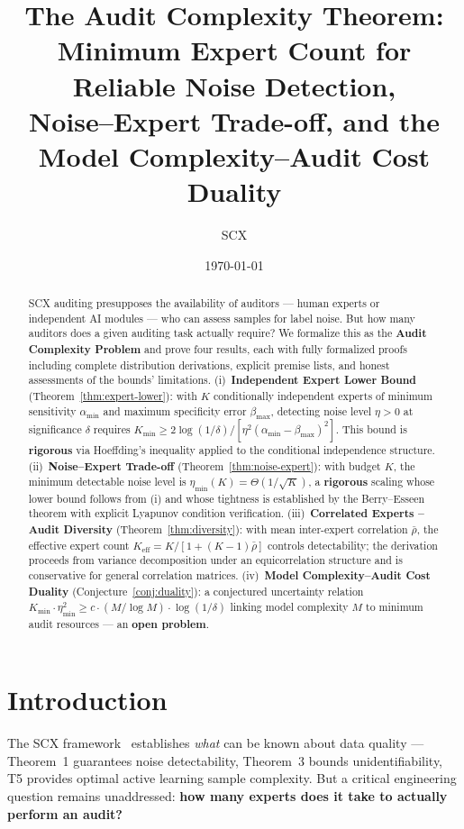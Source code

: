 \documentclass[12pt,a4paper]{article}
\title{\bfseries The Audit Complexity Theorem:\\
Minimum Expert Count for Reliable Noise Detection,\\
Noise--Expert Trade-off, and the\\
Model Complexity--Audit Cost Duality}
\author{SCX}
\date{\today}
\newcommand{\etamin}{\eta_{\min}}
\newcommand{\rhobar}{\bar{\rho}}
\begin{document}
\maketitle

\begin{abstract}
\textsf{SCX} auditing presupposes the availability of auditors --- human experts or
independent AI modules --- who can assess samples for label noise.  But how many
auditors does a given auditing task actually require?  We formalize this as the
\textbf{Audit Complexity Problem} and prove four results, each with fully
formalized proofs including complete distribution derivations, explicit premise
lists, and honest assessments of the bounds' limitations.
(i)~\textbf{Independent Expert Lower Bound} (Theorem~\ref{thm:expert-lower}):
with $K$ conditionally independent experts of minimum sensitivity
$\alpha_{\min}$ and maximum specificity error $\beta_{\max}$, detecting noise
level $\eta>0$ at significance $\delta$ requires
$K_{\min}\geq 2\log(1/\delta)/[\eta^{2}(\alpha_{\min}-\beta_{\max})^{2}]$.
This bound is \textbf{rigorous} via Hoeffding's inequality applied to the
conditional independence structure.
(ii)~\textbf{Noise--Expert Trade-off} (Theorem~\ref{thm:noise-expert}):
with budget $K$, the minimum detectable noise level is
$\etamin(K)=\Theta(1/\sqrt{K})$, a \textbf{rigorous} scaling whose lower bound
follows from (i) and whose tightness is established by the Berry--Esseen theorem
with explicit Lyapunov condition verification.
(iii)~\textbf{Correlated Experts -- Audit Diversity}
(Theorem~\ref{thm:diversity}): with mean inter-expert correlation $\rhobar$,
the effective expert count $K_{\mathrm{eff}}=K/[1+(K-1)\rhobar]$ controls
detectability; the derivation proceeds from variance decomposition under an
equicorrelation structure and is conservative for general correlation matrices.
(iv)~\textbf{Model Complexity--Audit Cost Duality}
(Conjecture~\ref{conj:duality}): a conjectured uncertainty relation
$K_{\min}\cdot\etamin^{2}\geq c\cdot(M/\log M)\cdot\log(1/\delta)$ linking
model complexity $M$ to minimum audit resources --- an \textbf{open problem}.
\end{abstract}

\section{Introduction}

The \textsf{SCX} framework~\citep{scx2024cercis} establishes \emph{what} can be known
about data quality --- Theorem~1 guarantees noise detectability, Theorem~3 bounds
unidentifiability, T5 provides optimal active learning sample complexity.  But
a critical engineering question remains unaddressed: \textbf{how many experts
does it take to actually perform an audit?}
\end{document}
